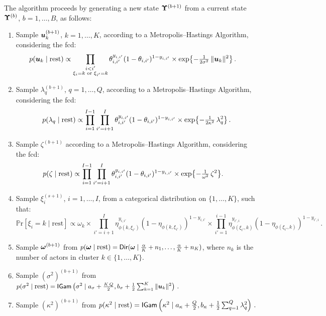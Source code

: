 \documentclass[letterpaper,12pt,openany]{article}
\def\exp#1{{\rm exp}{#1}}
\def\le{\left}
\def\ri{\right}
\newcommand{\pr}[1]{\mathbb{P}\text{r}\left[#1\right]}
\newcommand{\ex}[1]{\exp{ \left\{ #1 \right\}}}
\def\Dir{\small{\mathsf{Dir}}}
\def\IGamd{\small{\mathsf{IGam}}}
\def\rest{\text{rest}}
\def\al{\alpha}\def\alv{\boldsymbol{\alpha}}
\def\si{\sigma}\def\siv{\boldsymbol{\sigma}}
\def\sig{\sigma}\def\sigv{\boldsymbol{\sigma}}
\def\ome{\omega}
\def\kap{\kappa}
\begin{document}
The algorithm proceeds by generating a new state $\mathbf{\Upsilon}^{(b+1)}$ from a current state $\mathbf{\Upsilon}^{(b)}$, $b=1,\ldots,B$, as follows:
\begin{enumerate}
	\item Sample $\boldsymbol{u}_k^{(b+1)}$, $k=1,\ldots,K$, according to a Metropolis--Hastings Algorithm, considering the fcd:
	\begin{align*}
	p(\uv_k\mid\rest)
	&\propto\prod_{\substack{i<i'\\\xi_i = k\text{ or }\xi_{i'} = k}} \theta_{i,i'}^{y_{i,i'}}(1-\theta_{i,i'})^{1-y_{i,i'}} \times\ex{-\tfrac{1}{2\sig^2}\,\|\uv_k\|^2}\,.
	\end{align*}
	
	\item Sample $\lambda_q^{(b+1)}$, $q = 1,\ldots,Q$, according to a Metropolis--Hastings Algorithm, considering the fcd:
	$$
	p(\lambda_q\mid\rest) \propto \prod_{i=1}^{I-1}\prod_{i'=i+1}^{I} \theta_{i,i'}^{y_{i,i'}}(1-\theta_{i,i'})^{1-y_{i,i'}}\times \ex{-\tfrac{1}{2\kap^2}\,\lambda_q^2}\,.
	$$
	\item Sample $\zeta^{(b+1)}$ according to a Metropolis--Hastings Algorithm, considering the fcd:
	\begin{align*}
	p(\zeta\mid\rest)
	&\propto
	\prod_{i=1}^{I-1}\prod_{i'=i+1}^{I} \theta_{i,i'}^{y_{i,i'}}(1-\theta_{i,i'})^{1-y_{i,i'}}\times \ex{-\tfrac{1}{\ome^2}\,\zeta^2}.
	\end{align*}
	
	\item Sample $\xi_i^{(s+1)}$, $i=1,\ldots,I$, from a categorical distribution on $\{1,\ldots,K\}$, such that:
	$$
	\pr{\xi_i=k\mid\rest}\propto \omega_k
	\times\prod_{i'=i+1}^I \eta_{\phi(k,\xi_{i'})}^{y_{i,i'}}(1-\eta_{\phi(k,\xi_{i'})})^{1-y_{i,i'}}
	\times\prod_{i'=1}^{i-1} \eta_{\phi(\xi_{i'},k)}^{y_{i',i}}(1-\eta_{\phi(\xi_{i'},k)})^{1-y_{i',i}}\,.
	$$
	
	\item Sample $\boldsymbol{\omega}^{(b+1)}$ from $p(\omev\mid\rest) = \Dir(\omev\mid\tfrac{\al}{K}+n_1,\ldots,\tfrac{\al}{K}+n_K)$, where $n_k$ is the number of actors in cluster $k\in\{1,\ldots,K  \}$.
	
	\item Sample $(\si^2)^{(b+1)}$ from
	$p(\sig^2\mid\rest) = \IGamd\le(\sig^2 \mid a_\sig + \tfrac{K\,Q}2, b_\sig + \tfrac12 \textstyle\sum_{k=1}^K\|\uv_k\|^2 \ri)\,.$
	
	\item Sample $(\kap^2)^{(b+1)}$ from
	$p(\kap^2\mid\rest) = \IGamd\le(\kap^2 \mid a_\kap + \tfrac{Q}2, b_\kap + \tfrac12 \textstyle\sum_{q=1}^Q\lambda_q^2 \ri)\,.$
	

\end{enumerate}
\end{document}
